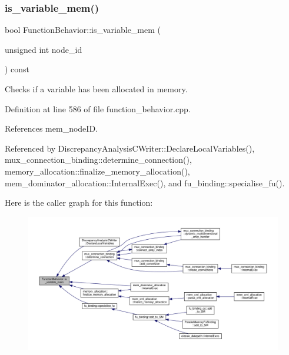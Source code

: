 \subsubsection{\texorpdfstring{is\+\_\+variable\+\_\+mem()}{is\_variable\_mem()}}
{\footnotesize\ttfamily bool Function\+Behavior\+::is\+\_\+variable\+\_\+mem (\begin{DoxyParamCaption}\item[{unsigned int}]{node\+\_\+id }\end{DoxyParamCaption}) const}



Checks if a variable has been allocated in memory. 



Definition at line 586 of file function\+\_\+behavior.\+cpp.



References mem\+\_\+node\+ID.



Referenced by Discrepancy\+Analysis\+C\+Writer\+::\+Declare\+Local\+Variables(), mux\+\_\+connection\+\_\+binding\+::determine\+\_\+connection(), memory\+\_\+allocation\+::finalize\+\_\+memory\+\_\+allocation(), mem\+\_\+dominator\+\_\+allocation\+::\+Internal\+Exec(), and fu\+\_\+binding\+::specialise\+\_\+fu().

Here is the caller graph for this function\+:
\nopagebreak
\begin{figure}[H]
\begin{center}
\leavevmode
\includegraphics[width=350pt]{d9/d45/classFunctionBehavior_a63c7b45bb5c4d9d24d14ce19fc9f38cb_icgraph}
\end{center}
\end{figure}
\mbox{\label{classFunctionBehavior_a67538dca89bd16d5a2aadb085fae1186}} 
